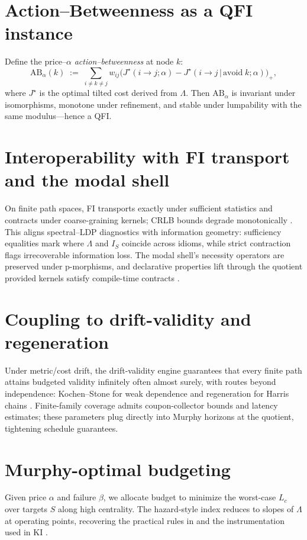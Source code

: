 \documentclass[11pt]{article}
\theoremstyle{plain}
\theoremstyle{definition}
\theoremstyle{remark}
\newcommand{\1}{\mathbbm{1}}
\begin{document}
\section{Action–Betweenness as a QFI instance}\label{sec:ab}
Define the price–\(\alpha\) \emph{action–betweenness} at node \(k\):
\begin{equation}
  \mathrm{AB}_\alpha(k)\;:=\;\sum_{i\neq k\neq j} w_{ij}\Big(J^\star(i\!\to\!j;\alpha)-J^\star(i\!\to\!j\,|\,\mathrm{avoid}\;k;\alpha)\Big)_+,
\end{equation}
where \(J^\star\) is the optimal tilted cost derived from \(\Lambda\). Then \(\mathrm{AB}_\alpha\) is invariant under isomorphisms, monotone under refinement, and stable under lumpability with the same modulus—hence a QFI.

\section{Interoperability with FI transport and the modal shell}\label{sec:interop}
On finite path spaces, FI transports exactly under sufficient statistics and contracts under coarse-graining kernels; CRLB bounds degrade monotonically \parencite{elliott2025idiom,CoverThomas2006,AmariNagaoka2000}. This aligns spectral–LDP diagnostics with information geometry: sufficiency equalities mark where \(\Lambda\) and \(I_S\) coincide across idioms, while strict contraction flags irrecoverable information loss. The modal shell’s necessity operators are preserved under p-morphisms, and declarative properties lift through the quotient provided kernels satisfy compile-time contracts \parencite{elliott2025ki,elliott2025contracts,elliott2025graded}.

\section{Coupling to drift-validity and regeneration}\label{sec:drift}
Under metric/cost drift, the drift-validity engine guarantees that every finite path attains budgeted validity infinitely often almost surely, with routes beyond independence: Kochen–Stone for weak dependence and regeneration for Harris chains \parencite{elliott2025drift,KochenStone1964,Freedman1975,MeynTweedie2009}. Finite-family coverage admits coupon-collector bounds and latency estimates; these parameters plug directly into Murphy horizons at the quotient, tightening schedule guarantees.

\section{Murphy-optimal budgeting}\label{sec:murphy}
Given price \(\alpha\) and failure \(\beta\), we allocate budget to minimize the worst-case \(L_c\) over targets \(S\) along high centrality. The hazard-style index reduces to slopes of \(\Lambda\) at operating points, recovering the practical rules in \parencite{elliott2025pmb} and the instrumentation used in KI \parencite{elliott2025ki}.
\end{document}
